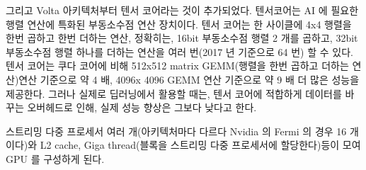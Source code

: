 그리고 Volta 아키텍처부터 텐서 코어라는 것이 추가되었다. 텐서코어는 AI 에 필요한
행렬 연산에 특화된 부동소수점 연산 장치이다. 텐서 코어는 한 사이클에 4x4 행렬을 한번
곱하고 한번 더하는 연산, 정확히는, 16bit 부동소수점 행렬 2 개를 곱하고, 32bit 부동소수점
행렬 하나를 더하는 연산을 여러 번(2017 년 기준으로 64 번) 할 수 있다. 텐서 코어는 쿠다
코어에 비해 512x512 matrix GEMM(행렬을 한번 곱하고 더하는 연산\cite{nvidia2023matrix})연산 기준으로
약 4 배, 4096x 4096 GEMM 연산 기준으로 약 9 배 더 많은 성능을 제공한다\cite{nvidia2017tensor}. 그러나
실제로 딥러닝에서 활용할 때는, 텐서 코어에 적합하게 데이터를 바꾸는 오버헤드로 인해,
실제 성능 향상은 그보다 낮다고 한다\cite{park2020gpu}.

스트리밍 다중 프로세서 여러 개(아키텍처마다 다르다 Nvidia 의 Fermi 의 경우
16 개이다)와 L2 cache, Giga thread(블록을 스트리밍 다중 프로세서에 할당한다)등이 모여
GPU 를 구성하게 된다.
